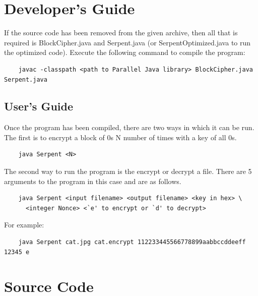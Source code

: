 \documentclass[12pt]{article} %
\begin{document}
\section{Developer's Guide}
  If the source code has been removed from the given archive, then all that is required is BlockCipher.java and Serpent.java (or SerpentOptimized.java to run the optimized code).  Execute the following command to compile the program:
  \begin{verbatim}
  	javac -classpath <path to Parallel Java library> BlockCipher.java Serpent.java
  \end{verbatim}
  
\subsection{User's Guide}
  Once the program has been compiled, there are two ways in which it can be run.  The first is to encrypt a block of 0s N number of times with a key of all 0s.
  \begin{verbatim}
  	java Serpent <N>
  \end{verbatim}
  The second way to run the program is the encrypt or decrypt a file.  There are 5 arguments to the program in this case and are as follows.
  \begin{verbatim}
  	java Serpent <input filename> <output filename> <key in hex> \
  	  <integer Nonce> <`e' to encrypt or `d' to decrypt>
  \end{verbatim}
  For example:
  \begin{verbatim}
  	java Serpent cat.jpg cat.encrypt 112233445566778899aabbccddeeff 12345 e
  \end{verbatim}

\section{Source Code}
\end{document}
